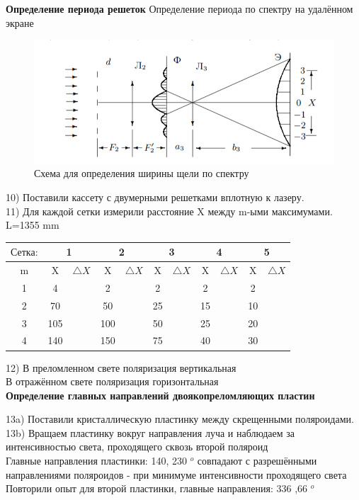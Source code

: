\documentclass[a4paper,12pt]{article} %
\begin{document}
\textbf{Определение периода решеток}
Определение периода по спектру на удалённом экране\\
\begin{figure}[H]
	\centering
	\includegraphics[width = 12 cm]{3.png}
	\caption{Схема для определения ширины щели по спектру}
\end{figure}
 10) Поставили кассету с двумерными решетками вплотную к лазеру.\\
 11) Для каждой сетки измерили расстояние X	между m-ыми максимумами. L=1355 mm\\
 \begin{center}
 

 \begin{tabular}{|c|c|c|c|c|c|c|c|c|c|c|}
 \hline 
 $\text{Сетка:}$ & \multicolumn{2}{c|}{1} & \multicolumn{2}{c|}{2} & \multicolumn{2}{c|}{3} & \multicolumn{2}{c|}{4} &\multicolumn{2}{c|}{5} \\ 
 \hline 
 m & X & $\bigtriangleup X$ & X& $\bigtriangleup X$ & X& $\bigtriangleup X$ & X& $\bigtriangleup X$ & X& $\bigtriangleup X$ \\ 
 \hline 
 1 & 4& & 2& & 2 && 2 && 2 &\\ 
 \hline 
 2 & 70 && 50& & 25& & 15& & 10& \\ 
 \hline 
 3 & 105& & 100 && 50& & 25& & 20& \\ 
 \hline 
 4 & 140& & 150& & 75& & 40& & 30& \\ 
 \hline 
 \end{tabular} 
 
\end{center}
 12) В преломленном свете поляризация вертикальная \\
  В отражённом свете поляризация  горизонтальная
\\

\textbf{Определение главных направлений двоякопреломляющих пластин}

	
 13a) Поставили кристаллическую пластинку между скрещенными поляроидами.\\
 13b) Вращаем пластинку вокруг направления луча и наблюдаем за интенсивностью света, проходящего сквозь второй поляроид\\
 Главные направления пластинки: 140, 230 $^o$ совпадают с разрешёнными направлениями поляроидов - при минимуме интенсивности проходящего света
 Повторили опыт для второй пластинки, главные направления: 336 ,66 $^o$\\
\end{document}
